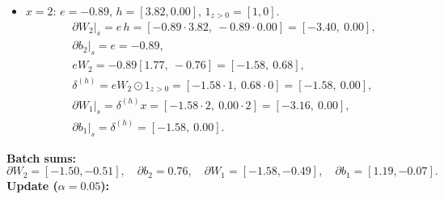 \documentclass[11pt]{article}
\begin{document}
\begin{itemize}
\begin{align*}
&\partial b_2\big|_s = e = 0.89,\\
&eW_2 = 0.89[1.77,\ -0.76] = [1.58,\ -0.68],\\
&\delta^{(h)} = eW_2 \odot 1_{z>0} = [1.58\cdot1,\ -0.68\cdot0] = [1.58,\ 0.00],\\
&\partial W_1\big|_s = \delta^{(h)} x = [1.58\cdot1,\ 0.00\cdot1] = [1.58,\ 0.00],\\
&\partial b_1\big|_s = \delta^{(h)} = [1.58,\ 0.00].
\end{align*}
\item $x=2$: $e=-0.89$, $h=[3.82, 0.00]$, $1_{z>0}=[1,0]$.
\begin{align*}
&\partial W_2\big|_s = e\,h = [-0.89\cdot3.82,\ -0.89\cdot0.00] = [-3.40,\ 0.00],\\
&\partial b_2\big|_s = e = -0.89,\\
&eW_2 = -0.89[1.77,\ -0.76] = [-1.58,\ 0.68],\\
&\delta^{(h)} = eW_2 \odot 1_{z>0} = [-1.58\cdot1,\ 0.68\cdot0] = [-1.58,\ 0.00],\\
&\partial W_1\big|_s = \delta^{(h)} x = [-1.58\cdot2,\ 0.00\cdot2] = [-3.16,\ 0.00],\\
&\partial b_1\big|_s = \delta^{(h)} = [-1.58,\ 0.00].
\end{align*}
\end{itemize}
\noindent\textbf{Batch sums:}
\[
\partial W_2=[-1.50, -0.51],\quad \partial b_2=0.76,\quad \partial W_1=[-1.58, -0.49],\quad \partial b_1=[1.19, -0.07].
\]
\noindent\textbf{Update ($\alpha=0.05$):}
\end{document}
